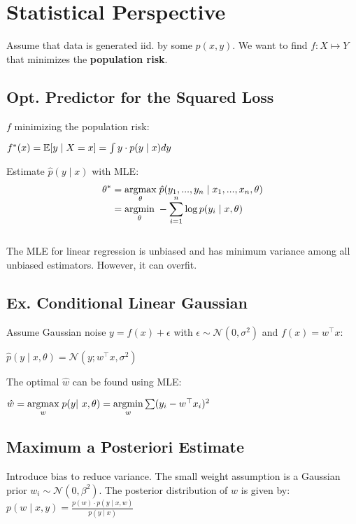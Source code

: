 \section*{Statistical Perspective}

Assume that data is generated iid. by some $p(x, y)$. We want to find $f: X \mapsto Y$ that minimizes the \textbf{population risk}.

\subsection*{Opt. Predictor for the Squared Loss}

$f$ minimizing the population risk:

\qquad $f^*(x) = \mathbb{E}[y \; | \; X = x] = \int y \cdot p(y \; | \; x) dy$

Estimate $\hat{p}(y \; | \; x)$ with MLE:
\begin{align*}
	\theta^* &= \underset{\theta}{\text{argmax}} \; \hat{p}(y_1, ..., y_n \; | \; x_1, ..., x_n, \theta) \\[-10pt]
	&= \underset{\theta}{\text{argmin}} \; - \sum_{i=1}^n \log p(y_i \; | \; x, \theta) 
\end{align*} \\[-15pt]

The MLE for linear regression is unbiased and has minimum variance among all unbiased estimators. However, it can overfit.

\subsection*{Ex. Conditional Linear Gaussian}

Assume Gaussian noise $y = f(x) + \epsilon$ with $\epsilon \sim \mathcal{N}(0, \sigma^2)$ and $f(x) = w^\top x$:

\qquad \qquad $\hat p(y \; | \; x, \theta) = \mathcal{N}(y; w^\top x, \sigma^2)$

The optimal $\hat w$ can be found using MLE:

$\hat w = \argmax{w} \; p(y | x, \theta) =\argmin{w} \sum (y_i - w^\top x_i)^2$

\subsection*{Maximum a Posteriori Estimate}

Introduce bias to reduce variance. The small weight assumption is a Gaussian prior $w_i \sim \mathcal{N}(0, \beta^2)$. The posterior distribution of $w$ is given by:
$p(w \; | \; x, y) = \frac{p(w) \cdot p( y \; | \; x, w)}{p( y \; | \; x)}$


